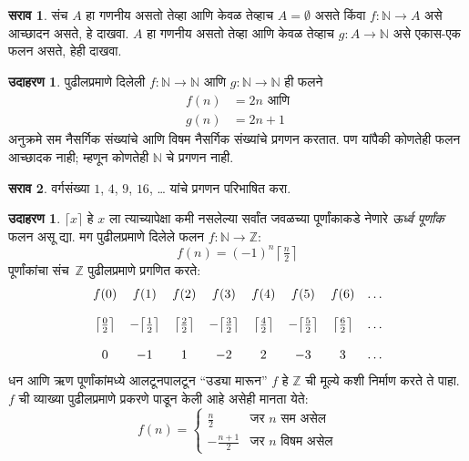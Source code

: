 \documentclass[11pt,a4paper,openany]{book}
\theoremstyle{definition}
\newtheorem{ex}[defn]{उदाहरण}
\newtheorem{prob}{सराव}[chapter]
\newcommand{\Nat}{\mathbb{N}}
\newcommand{\Int}{\mathbb{Z}}
\begin{document}
\begin{prob}
संच $A$ हा गणनीय असतो तेव्हा आणि केवळ तेव्हाच $A =
\emptyset$ असते किंवा $f\colon \Nat \to A$ असे आच्छादन
असते, हे दाखवा. $A$ हा गणनीय असतो तेव्हा आणि केवळ तेव्हाच
$g\colon A \to \Nat$ असे एकास-एक फलन असते, हेही दाखवा.
\end{prob}

\begin{ex}
पुढीलप्रमाणे दिलेली $f\colon \Nat \to \Nat$ आणि $g \colon \Nat
\to \Nat$ ही फलने
\begin{align*}
  f(n) & = 2n \text{ आणि}\\
  g(n) & = 2n+1
\end{align*}
अनुक्रमे सम नैसर्गिक संख्यांचे आणि विषम नैसर्गिक संख्यांचे प्रगणन
करतात. पण यांपैकी कोणतेही फलन आच्छादक नाही; म्हणून कोणतेही
$\Nat$ चे प्रगणन नाही.
\end{ex}

\begin{prob}
वर्गसंख्या $1$, $4$, $9$, $16$, \dots{} यांचे प्रगणन परिभाषित करा.
\end{prob}

\begin{ex}
$\lceil x \rceil$ हे $x$ ला त्याच्यापेक्षा कमी नसलेल्या सर्वांत जवळच्या
पूर्णांकाकडे नेणारे \emph{ऊर्ध्व पूर्णांक} फलन असू द्या. मग पुढीलप्रमाणे
दिलेले फलन $f \colon \Nat \to \Int$:
\[
  f(n) = (-1)^{n} \left\lceil\tfrac{n}{2}\right\rceil
\]
पूर्णांकांचा संच~$\Int$ पुढीलप्रमाणे प्रगणित करते:
\[
\begin{array}{c c c c c c c c}
f(0) & f(1) & f(2) & f(3) & f(4) & f(5) & f(6) & \dots \\ \\
\big\lceil \tfrac{0}{2} \big\rceil & -\big\lceil \tfrac{1}{2}\big\rceil &  \big\lceil \tfrac{2}{2} \big\rceil & -\big\lceil \tfrac{3}{2} \big\rceil & \big\lceil \tfrac{4}{2} \big\rceil  & -\big\lceil \tfrac{5}{2}\big\rceil & \big\lceil \tfrac{6}{2} \big\rceil & \dots \\ \\
0 & -1 & 1 & -2 & 2 & -3 & 3& \dots
\end{array}
\]
धन आणि ऋण पूर्णांकांमध्ये आलटूनपालटून ``उड्या मारून'' $f$ हे $\Int$
ची मूल्ये कशी निर्माण करते ते पाहा. $f$ ची व्याख्या पुढीलप्रमाणे
प्रकरणे पाडून केली आहे असेही मानता येते:
\[
f(n) = \begin{cases}
  \frac{n}{2} & \text{जर $n$ सम असेल}\\
  -\frac{n+1}{2} & \text{जर $n$ विषम असेल}
  \end{cases}
\]
\end{ex}
\end{document}
